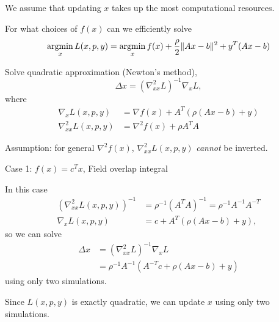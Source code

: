 \documentclass[landscape]{foils}
\begin{document}
\item We assume that updating $x$ takes up the most computational resources.
\EIT
\newpage

\BIT
\item For what choices of $f(x)$ can we efficiently solve
        \begin{multline}
        \mathop{\rm argmin}_x L(x,p,y) = 
            \mathop{\rm argmin}_x f(x) + \frac{\rho}{2} \| Ax - b \|^2  + y^T (Ax - b)
        \end{multline}

\item Solve quadratic approximation (Newton's method),
    \begin{equation}
    \Delta x = (\nabla^2_{xx} L)^{-1} \nabla_x L,
    \end{equation}
    where
    \begin{subequations}\begin{align}
    \nabla_x L(x,p,y) &= \nabla f(x) + A^T (\rho (Ax - b) + y) \\
    \nabla^2_{xx} L(x,p,y) &= \nabla^2 f(x) + \rho A^T A
    \end{align}\end{subequations}

\item Assumption: for general $\nabla^2 f(x)$, $\nabla^2_{xx} L(x,p,y)$ 
    \emph{cannot} be inverted.
\EIT
\newpage

\BIT
\item Case 1: $f(x) = c^T x$, Field overlap integral
\item In this case 
    \begin{subequations}\begin{align}
    (\nabla^2_{xx} L(x,p,y))^{-1} &= 
        \rho^{-1} (A^T A)^{-1} = \rho^{-1} A^{-1} A^{-T} \\
    \nabla_x L(x,p,y) &= c + A^T (\rho (Ax - b) + y),
    \end{align}\end{subequations}
    so we can solve 
    \begin{subequations}\begin{align}
    \Delta x &= (\nabla^2_{xx} L)^{-1} \nabla_x L \\
        &= \rho^{-1} A^{-1}( A^{-T} c + \rho(Ax - b) + y)
    \end{align}\end{subequations}
    using only two simulations.
\item Since $L(x,p,y)$ is exactly quadratic, 
        we can update $x$ using only two simulations.
\EIT
\newpage
\end{document}
